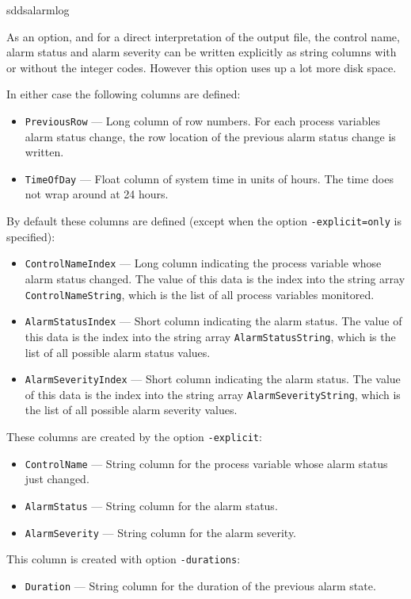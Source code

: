 \begin{sddsprog}{sddsalarmlog}
\begin{itemize}
As an option, and for a direct interpretation of the output file, the control
name, alarm status and alarm severity can be written explicitly as
string columns with or without the integer codes. However this
option uses up a lot more disk space.

In either case the following columns are defined:
  \begin{itemize}
    \item {\tt PreviousRow} --- Long column of row numbers. For each
        process variables alarm status change, the row location of the
        previous alarm status change is written.
    \item {\tt TimeOfDay} --- Float column of system time in units of hours.
        The time does not wrap around at 24 hours.
  \end{itemize}

By default these columns are defined (except when the option {\tt -explicit=only} is specified):
  \begin{itemize}
    \item {\tt ControlNameIndex} --- Long column indicating the process variable whose
        alarm status changed. The value of this data is the index into the string array
        {\tt ControlNameString}, which is the list of all process variables monitored.
    \item {\tt AlarmStatusIndex} --- Short column indicating the alarm status.
         The value of this data is the index into the string array
        {\tt AlarmStatusString}, which is the list of all possible alarm status values.
    \item {\tt AlarmSeverityIndex} --- Short column indicating the alarm status.
        The value of this data is the index into the string array
        {\tt AlarmSeverityString}, which is the list of all possible alarm severity values.
  \end{itemize}

These columns are created by the option {\tt -explicit}:
  \begin{itemize}
    \item {\tt ControlName} --- String column for the process variable whose alarm
        status just changed.
    \item {\tt AlarmStatus} --- String column for the alarm status.
    \item {\tt AlarmSeverity} --- String column for the alarm severity.
  \end{itemize}

This column is created with option {\tt -durations}:
  \begin{itemize}
    \item {\tt Duration} --- String column for the duration of the previous alarm state.
  \end{itemize}


\end{itemize}
\end{sddsprog}
